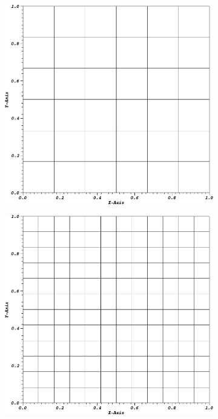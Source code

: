 \begin{figure}
\centering
{
	\begin{subfigure}[b]{0.45\textwidth}
		\centering
		\label{subfig::SineMMS_CartMesh00}
		\includegraphics[width=\textwidth]{figures/sec_BF/SineCartMesh_cyc00.png}
	\end{subfigure}
	\hfill
	\begin{subfigure}[b]{0.45\textwidth}
		\centering
		\label{subfig::SineMMS_CartMesh01}
		\includegraphics[width=\textwidth]{figures/sec_BF/SineCartMesh_cyc01.png}

\end{subfigure}}
\end{figure}
